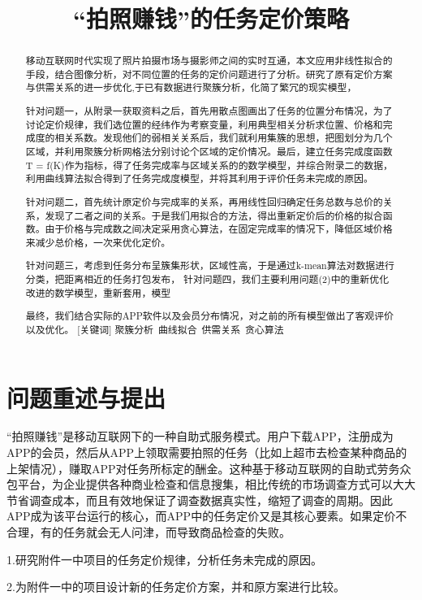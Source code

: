 \documentclass{ctexart}
\title{“拍照赚钱”的任务定价策略}
\date{}
\begin{document}
\maketitle
\begin{abstract}
移动互联网时代实现了照片拍摄市场与摄影师之间的实时互通，本文应用非线性拟合的手段，结合图像分析，对不同位置的任务的定价问题进行了分析。研究了原有定价方案与供需关系的进一步优化,于已有数据进行聚簇分析，化简了繁冗的现实模型，

针对问题一，从附录一获取资料之后，首先用散点图画出了任务的位置分布情况，为了讨论定价规律，我们选位置的经纬作为考察变量，利用典型相关分析求位置、价格和完成度的相关系数。发现他们的弱相关关系后，我们就利用集簇的思想，把图划分为几个区域，并利用聚簇分析网格法分别讨论个区域的定价情况。最后，建立任务完成度函数T = f(K)作为指标，得了任务完成率与区域关系的的数学模型，并综合附录二的数据，利用曲线算法拟合得到了任务完成度模型，并将其利用于评价任务未完成的原因。

针对问题二，首先统计原定价与完成率的关系，再用线性回归确定任务总数与总价的关系，发现了二者之间的关系。于是我们用拟合的方法，得出重新定价后的价格的拟合函数。由于价格与完成数之间决定采用贪心算法，在固定完成率的情况下，降低区域价格来减少总价格，一次来优化定价。

针对问题三，考虑到任务分布呈簇集形状，区域性高，于是通过k-mean算法对数据进行分类，把距离相近的任务打包发布，
针对问题四，我们主要利用问题(2)中的重新优化改进的数学模型，重新套用，模型

最终，我们结合实际的APP软件以及会员分布情况，对之前的所有模型做出了客观评价以及优化。
[关键词] 聚簇分析\ 曲线拟合\ 供需关系\ 贪心算法\ 
\end{abstract}
\newpage
\section{问题重述与提出}
“拍照赚钱”是移动互联网下的一种自助式服务模式。用户下载APP，注册成为APP的会员，然后从APP上领取需要拍照的任务（比如上超市去检查某种商品的上架情况），赚取APP对任务所标定的酬金。这种基于移动互联网的自助式劳务众包平台，为企业提供各种商业检查和信息搜集，相比传统的市场调查方式可以大大节省调查成本，而且有效地保证了调查数据真实性，缩短了调查的周期。因此APP成为该平台运行的核心，而APP中的任务定价又是其核心要素。如果定价不合理，有的任务就会无人问津，而导致商品检查的失败。

1.研究附件一中项目的任务定价规律，分析任务未完成的原因。

2.为附件一中的项目设计新的任务定价方案，并和原方案进行比较。
\end{document}
